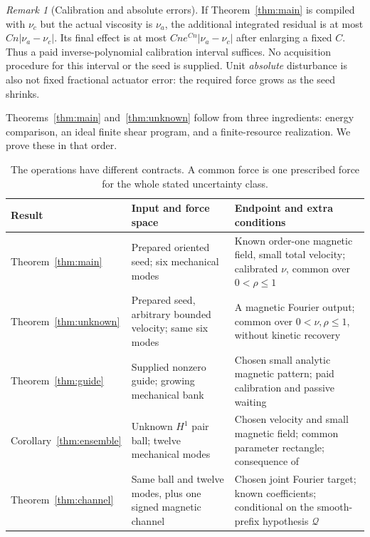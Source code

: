 \documentclass[11pt,a4paper]{amsart}
\theoremstyle{definition}
\theoremstyle{remark}
\newtheorem{remark}[theorem]{Remark}
\numberwithin{equation}{section}
\newcommand{\Qcal}{\mathcal Q}
\begin{document}
\begin{remark}[Calibration and absolute errors]\label{rem:calibration}
If Theorem~\ref{thm:main} is compiled with $\nu_c$ but the actual viscosity is $\nu_a$, the additional integrated residual is at most $Cn|\nu_a-\nu_c|$. Its final effect is at most $Cn e^{Cn}|\nu_a-\nu_c|$ after enlarging a fixed $C$. Thus a paid inverse-polynomial calibration interval suffices. No acquisition procedure for this interval or the seed is supplied. Unit \emph{absolute} disturbance is also not fixed fractional actuator error: the required force grows as the seed shrinks.
\end{remark}

Theorems~\ref{thm:main} and~\ref{thm:unknown} follow from three ingredients: energy comparison, an ideal finite shear program, and a finite-resource realization. We prove these in that order.

\begin{table}[htbp]
\caption{The operations have different contracts. A common force is one prescribed force for the whole stated uncertainty class.}\label{tab:contracts}
\small
\begin{tabular}{@{}p{.20\linewidth}p{.36\linewidth}p{.38\linewidth}@{}}
\toprule
Result & Input and force space & Endpoint and extra conditions\\
\midrule
Theorem~\ref{thm:main} &
Prepared oriented seed; six mechanical modes &
Known order-one magnetic field, small total velocity; calibrated $\nu$, common over $0<\rho\le1$\\[4pt]
Theorem~\ref{thm:unknown} &
Prepared seed, arbitrary bounded velocity; same six modes &
A magnetic Fourier output; common over $0<\nu,\rho\le1$, without kinetic recovery\\[4pt]
Theorem~\ref{thm:guide} &
Supplied nonzero guide; growing mechanical bank &
Chosen small analytic magnetic pattern; paid calibration and passive waiting\\[4pt]
Corollary~\ref{thm:ensemble} &
Unknown $H^1$ pair ball; twelve mechanical modes &
Chosen velocity and small magnetic field; common parameter rectangle; consequence of \cite[Theorem~2.2]{CommonControl}\\[4pt]
Theorem~\ref{thm:channel} &
Same ball and twelve modes, plus one signed magnetic channel &
Chosen joint Fourier target; known coefficients; conditional on the smooth-prefix hypothesis $\Qcal$\\
\bottomrule
\end{tabular}
\end{table}
\end{document}
